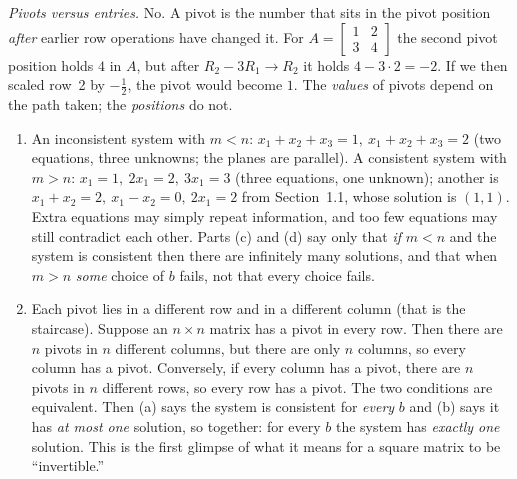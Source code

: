 \documentclass[11pt]{article}
\begin{document}
\begin{description}[leftmargin=0pt,itemsep=5pt]
        \emph{Pivots versus entries.} No. A pivot is the number that sits in the pivot position \emph{after}
        earlier row operations have changed it. For $A=\begin{bmatrix}1&2\\3&4\end{bmatrix}$ the second pivot
        position holds $4$ in $A$, but after $R_2-3R_1\to R_2$ it holds $4-3\cdot2=-2$. If we then scaled row~2
        by $-\tfrac12$, the pivot would become $1$. The \emph{values} of pivots depend on the path taken; the
        \emph{positions} do not.
  \item[Pause and think \ref{think:shape}.]
        \begin{enumerate}[label=(\arabic*),nosep,leftmargin=*]
          \item An inconsistent system with $m<n$: $x_1+x_2+x_3=1,\ x_1+x_2+x_3=2$ (two equations, three
                unknowns; the planes are parallel). A consistent system with $m>n$:
                $x_1=1,\ 2x_1=2,\ 3x_1=3$ (three equations, one unknown); another is
                $x_1+x_2=2,\ x_1-x_2=0,\ 2x_1=2$ from Section~1.1, whose solution is $(1,1)$.
                Extra equations may simply repeat information, and too few equations may still
                contradict each other. Parts (c) and (d) say only that \emph{if} $m<n$ and the system is
                consistent then there are infinitely many solutions, and that when $m>n$ \emph{some} choice
                of $b$ fails, not that every choice fails.
          \item Each pivot lies in a different row and in a different column (that is the staircase).
                Suppose an $n\times n$ matrix has a pivot in every row. Then there are $n$ pivots in $n$
                different columns, but there are only $n$ columns, so every column has a pivot.
                Conversely, if every column has a pivot, there are $n$ pivots in $n$ different rows, so every
                row has a pivot. The two conditions are equivalent. Then (a) says the system is consistent
                for \emph{every} $b$ and (b) says it has \emph{at most one} solution, so together: for every
                $b$ the system has \emph{exactly one} solution. This is the first glimpse of what it means for
                a square matrix to be ``invertible.''
        \end{enumerate}

\end{description}
\end{document}
